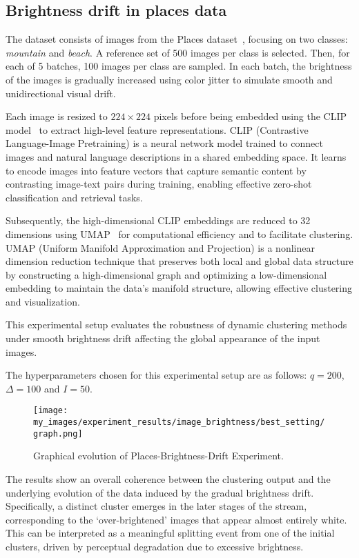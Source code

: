 \subsection{Brightness drift in places data}\label{subsec:brightness}

The dataset consists of images from the Places dataset~\cite{placesdataset},
focusing on two classes: \emph{mountain} and \emph{beach}. A reference set of
500 images per class is selected. Then, for each of 5 batches, 100 images per
class are sampled. In each batch, the brightness of the images is gradually
increased using color jitter to simulate smooth and unidirectional visual
drift.

Each image is resized to $224 \times 224$ pixels before being embedded using
the CLIP model~\cite{clip} to extract high-level feature representations. CLIP
(Contrastive Language-Image Pretraining) is a neural network model trained to
connect images and natural language descriptions in a shared embedding space.
It learns to encode images into feature vectors that capture semantic content
by contrasting image-text pairs during training, enabling effective zero-shot
classification and retrieval tasks.

Subsequently, the high-dimensional CLIP embeddings are reduced to 32 dimensions
using UMAP~\cite{umap} for computational efficiency and to facilitate
clustering. UMAP (Uniform Manifold Approximation and Projection) is a nonlinear
dimension reduction technique that preserves both local and global data
structure by constructing a high-dimensional graph and optimizing a
low-dimensional embedding to maintain the data's manifold structure, allowing
effective clustering and visualization.

This experimental setup evaluates the robustness of dynamic clustering methods
under smooth brightness drift affecting the global appearance of the input
images.

The hyperparameters chosen for this experimental setup are as follows: $q =
      200$, $\Delta = 100$ and $I=50$.

\begin{figure}[H]
      \centering
      \texttt{[image: my\_images/experiment\_results/image\_brightness/best\_setting/graph.png]}
      \caption{Graphical evolution of Places-Brightness-Drift Experiment.}
\end{figure}

The results show an overall coherence between the clustering output and the
underlying evolution of the data induced by the gradual brightness drift.
Specifically, a distinct cluster emerges in the later stages of the stream,
corresponding to the `over-brightened' images that appear almost entirely
white. This can be interpreted as a meaningful splitting event from one of the
initial clusters, driven by perceptual degradation due to excessive brightness.


